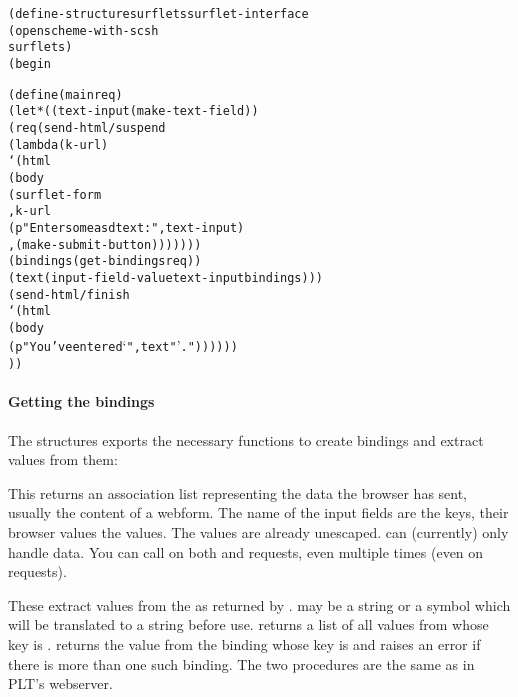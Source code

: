 \begin{alltt}
(define-structure surflets surflet-interface
  (open scheme-with-scsh
        surflets)
  (begin
    
    (define (main req)
      (let* ((text-input (make-text-field))
             (req (send-html/suspend
                   (lambda (k-url)
                     `(html
                       (body
                        (surflet-form
                         ,k-url
                         (p "Enter some asd  text: " ,text-input)
                         ,(make-submit-button)))))))
             (bindings (get-bindings req))
             (text (input-field-value text-input bindings)))
        (send-html/finish 
         `(html
           (body
            (p "You've entered `" ,text "'."))))))
))
\end{alltt}

\paragraph{Getting the bindings}

The  structures exports the necessary functions
  to create bindings and extract values from them:

\begin{desc}
  This returns an association list representing the data the browser
  has sent, usually the content of a webform.  The name of the input
  fields are the keys, their browser values the values.  The values
  are already unescaped.   can (currently) only
  handle  data.  You can call
   on both  and  requests, even
  multiple times (even on  requests).
\end{desc}

\begin{desc}
  These extract values from the  as returned by
  .   may be a string or a symbol which will
  be translated to a string before use.   returns
  a list of all values from  whose key is .
   returns the value from the binding whose
  key is  and raises an error if there is more than one such
  binding.  The two procedures are the same as in PLT's webserver.
\end{desc}

